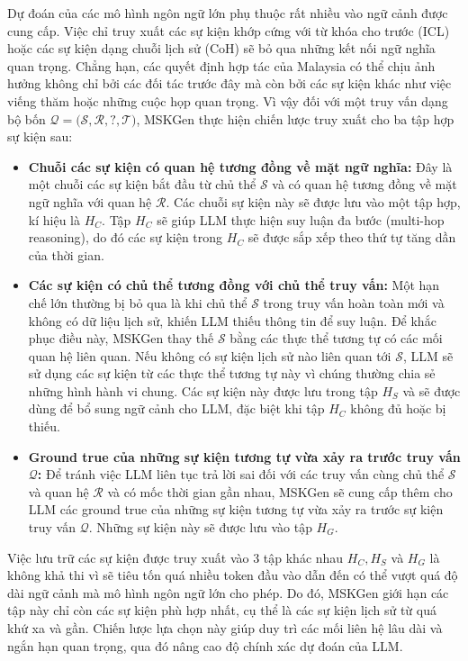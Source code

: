 Dự đoán của các mô hình ngôn ngữ lớn phụ thuộc rất nhiều vào ngữ cảnh được cung cấp. Việc chỉ truy xuất các sự kiện khớp cứng với từ khóa cho trước (ICL) hoặc các sự kiện dạng chuỗi lịch sử (CoH) sẽ bỏ qua những kết nối ngữ nghĩa quan trọng. Chẳng hạn, các quyết định hợp tác của Malaysia có thể chịu ảnh hưởng không chỉ bởi các đối tác trước đây mà còn bởi các sự kiện khác như việc viếng thăm hoặc những cuộc họp quan trọng. Vì vậy đối với một truy vấn dạng bộ bốn $\mathcal{Q = (S, R, ?, T})$, MSKGen thực hiện chiến lược truy xuất cho ba tập hợp sự kiện sau:
\begin{itemize}
    \item \textbf{Chuỗi các sự kiện có quan hệ tương đồng về mặt ngữ nghĩa:} Đây là một chuỗi các sự kiện bắt đầu từ chủ thể $\mathcal{S}$ và có quan hệ tương đồng về mặt ngữ nghĩa với quan hệ $\mathcal{R}$. Các chuỗi sự kiện này sẽ được lưu vào một tập hợp, kí hiệu là $H_C$. Tập $H_C$ sẽ giúp LLM thực hiện suy luận đa bước (multi-hop reasoning), do đó các sự kiện trong $H_C$ sẽ được sắp xếp theo thứ tự tăng dần của thời gian.
    \item \textbf{Các sự kiện có chủ thể tương đồng với chủ thể truy vấn:} Một hạn chế lớn thường bị bỏ qua là khi chủ thể $\mathcal{S}$ trong truy vấn hoàn toàn mới và không có dữ liệu lịch sử, khiến LLM thiếu thông tin để suy luận. Để khắc phục điều này, MSKGen thay thế $\mathcal{S}$ bằng các thực thể tương tự có các mối quan hệ liên quan. Nếu không có sự kiện lịch sử nào liên quan tới $\mathcal{S}$, LLM sẽ sử dụng các sự kiện từ các thực thể tương tự này vì chúng thường chia sẻ những hình hành vi chung. Các sự kiện này được lưu trong tập $H_S$ và sẽ được dùng để bổ sung ngữ cảnh cho LLM, đặc biệt khi tập $H_C$ không đủ hoặc bị thiếu.
    \item \textbf{Ground true của những sự kiện tương tự vừa xảy ra trước truy vấn $\mathcal{Q}$:} Để tránh việc LLM liên tục trả lời sai đối với các truy vấn cùng chủ thể $\mathcal{S}$ và quan hệ $\mathcal{R}$ và có mốc thời gian gần nhau, MSKGen sẽ cung cấp thêm cho LLM các ground true của những sự kiện tương tự vừa xảy ra trước sự kiện truy vấn $\mathcal{Q}$. Những sự kiện này sẽ được lưu vào tập $H_G$.
\end{itemize}

Việc lưu trữ các sự kiện được truy xuất vào 3 tập khác nhau $H_C, H_S$ và $H_G$ là không khả thi vì sẽ tiêu tốn quá nhiều token đầu vào dẫn đến có thể vượt quá độ dài ngữ cảnh mà mô hình ngôn ngữ lớn cho phép. Do đó, MSKGen giới hạn các tập này chỉ còn các sự kiện phù hợp nhất, cụ thể là các sự kiện lịch sử từ quá khứ xa và gần. Chiến lược lựa chọn này giúp duy trì các mối liên hệ lâu dài và ngắn hạn quan trọng, qua đó nâng cao độ chính xác dự đoán của LLM. 

